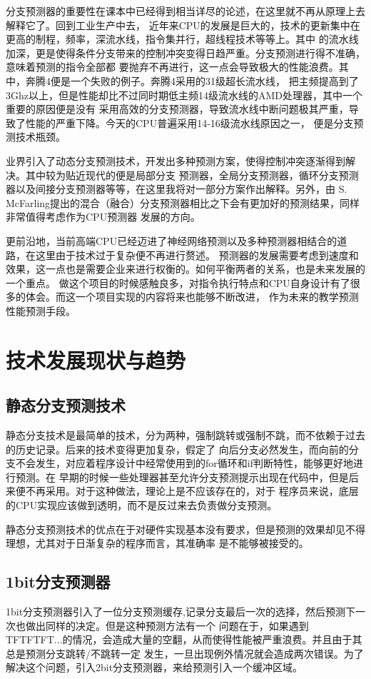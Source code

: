 \documentclass[forprint]{WHUBachelor}
\begin{document}
   分支预测器的重要性在课本中已经得到相当详尽的论述，在这里就不再从原理上去解释它了。回到工业生产中去，
近年来CPU的发展是巨大的，技术的更新集中在更高的制程，频率，深流水线，指令集并行，超线程技术等等上。其中
的流水线加深，更是使得条件分支带来的控制冲突变得日趋严重。分支预测进行得不准确，意味着预测的指令全部都
要抛弃不再进行，这一点会导致极大的性能浪费。其中，奔腾4便是一个失败的例子。奔腾4采用的31级超长流水线，
把主频提高到了3Ghz以上，但是性能却比不过同时期低主频14级流水线的AMD处理器，其中一个重要的原因便是没有
采用高效的分支预测器，导致流水线中断问题极其严重，导致了性能的严重下降。今天的CPU普遍采用14-16级流水线原因之一，
便是分支预测技术瓶颈。\par
业界引入了动态分支预测技术，开发出多种预测方案，使得控制冲突逐渐得到解决。其中较为贴近现代的便是局部分支
预测器，全局分支预测器，循环分支预测器以及间接分支预测器等等，在这里我将对一部分方案作出解释。另外，由
S. McFarling提出的混合（融合）分支预测器相比之下会有更加好的预测结果，同样非常值得考虑作为CPU预测器
发展的方向。\par
更前沿地，当前高端CPU已经迈进了神经网络预测以及多种预测器相结合的道路，在这里由于技术过于复杂便不再进行赘述。
预测器的发展需要考虑到速度和效果，这一点也是需要企业来进行权衡的。如何平衡两者的关系，也是未来发展的一个重点。
做这个项目的时候感触良多，对指令执行特点和CPU自身设计有了很多的体会。而这一个项目实现的内容将来也能够不断改进，
作为未来的教学预测性能预测手段。
  \section{技术发展现状与趋势}\label{sec-compile}

  \subsection{静态分支预测技术}
静态分支技术是最简单的技术，分为两种，强制跳转或强制不跳，而不依赖于过去的历史记录。后来的技术变得更加复杂，假定了
向后分支必然发生，而向前的分支不会发生，对应着程序设计中经常使用到的for循环和if判断特性，能够更好地进行预测。在
早期的时候一些处理器甚至允许分支预测提示出现在代码中，但是后来便不再采用。对于这种做法，理论上是不应该存在的，对于
程序员来说，底层的CPU实现应该做到透明，而不是反过来去负责做分支预测。\par
静态分支预测技术的优点在于对硬件实现基本没有要求，但是预测的效果却见不得理想，尤其对于日渐复杂的程序而言，其准确率
是不能够被接受的。


  \subsection{1bit分支预测器}
1bit分支预测器引入了一位分支预测缓存,记录分支最后一次的选择，然后预测下一次也做出同样的决定。但是这种预测方法有一个
问题在于，如果遇到TFTFTFT...的情况，会造成大量的空翻，从而使得性能被严重浪费。并且由于其总是预测分支跳转/不跳转一定
发生，一旦出现例外情况就会造成两次错误。为了解决这个问题，引入2bit分支预测器，来给预测引入一个缓冲区域。
\end{document}

